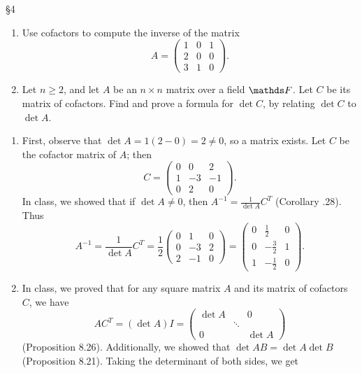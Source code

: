 \documentclass{homework}
\begin{document}
\begin{problem}{\S 4}
  \begin{enumerate}[label=(\alph*)]
    \item Use cofactors to compute the inverse of the matrix \[
        A=\begin{pmatrix} 1&0&1\\2&0&0\\3&1&0 \end{pmatrix} 
      .\] 
    \item Let $n\ge 2$, and let $A$ be an $n\times n$ matrix over a field $\F$. Let $C$ be its
      matrix of cofactors. Find and prove a formula for $\det{C}$, by relating $\det{C}$ to
      $\det{A}$.
  \end{enumerate}
\end{problem}
\begin{solution}
  \begin{enumerate}[label=(\alph*)]
    \item First, observe that $\det{A}=1(2-0)=2\neq 0$, so a matrix exists. Let $C$ be the cofactor
      matrix of $A$; then \[
      C=\begin{pmatrix} 0&0&2\\1&-3&-1\\0&2&0 \end{pmatrix} 
    .\] In class, we showed that if $\det{A}\neq 0$, then $A^{-1}=\frac{1}{\det{A}}C^T$ (Corollary
    .28). Thus \[
      A^{-1}=\frac{1}{\det{A}}C^T=\frac{1}{2}\begin{pmatrix} 0&1&0\\0&-3&2\\2&-1&0 \end{pmatrix}
      =\begin{pmatrix} 0&\frac{1}{2}&0\\0&-\frac{3}{2}&1\\1&-\frac{1}{2}&0 \end{pmatrix} 
    .\] 
    \item In class, we proved that for any square matrix $A$ and its matrix of cofactors $C$, we
      have
      \[
        AC^T=(\det{A})I=\begin{pmatrix} \det{A}&&0\\&\ddots&\\0&&\det{A} \end{pmatrix} 
      \] (Proposition 8.26). Additionally, we showed that $\det{AB}=\det{A}\det{B}$ (Proposition
      8.21). Taking the determinant of both sides, we get
      \begin{align*}

\end{align*}
\end{enumerate}
\end{solution}
\end{document}
